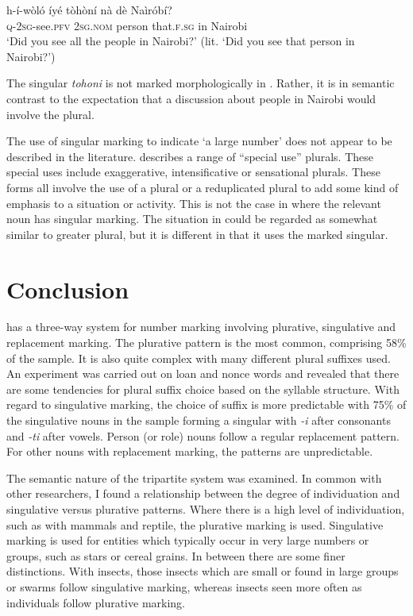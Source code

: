 \documentclass[output=paper]{langsci/langscibook}
\begin{document}
\ea\label{ex:moodie:14}
\gll h-í-wòló íyé tòhòní nà dè Naìróbí? \\
\textsc{q-2sg}-see.\textsc{pfv} 2\textsc{sg.nom} person that.\textsc{f.sg} in Nairobi \\
\glt ‘Did you see all the people in Nairobi?’ (lit. ‘Did you see that person in Nairobi?’)
\z

The singular \textit{tohoni} is not marked morphologically in . Rather, it is in semantic contrast to the expectation that a discussion about people in Nairobi would involve the plural.

The use of singular marking to indicate ‘a large number’ does not appear to be described in the literature. \citet[234]{Corbett2000} describes a range of “special use” plurals. These special uses include exaggerative, intensificative or sensational plurals. These forms all involve the use of a plural or a reduplicated plural to add some kind of emphasis to a situation or activity. This is not the case in  where the relevant noun has singular marking. The situation in  could be regarded as somewhat similar to greater plural, but it is different in that it uses the marked singular. 

\section{Conclusion}

 has a three-way system for number marking involving plurative, singulative and replacement marking. The plurative pattern is the most common, comprising 58\% of the sample. It is also quite complex with many different plural suffixes used. An experiment was carried out on loan and nonce words and revealed that there are some tendencies for plural suffix choice based on the syllable structure. With regard to singulative marking, the choice of suffix is more predictable with 75\% of the singulative nouns in the sample forming a singular with \textit{-i} after consonants and \textit{-ti} after vowels. Person (or role) nouns follow a regular replacement pattern. For other nouns with replacement marking, the patterns are unpredictable.

The semantic nature of the tripartite system was examined. In common with other researchers, I found a relationship between the degree of individuation and singulative versus plurative patterns. Where there is a high level of individuation, such as with mammals and reptile, the plurative marking is used. Singulative marking is used for entities which typically occur in very large numbers or groups, such as stars or cereal grains. In between there are some finer distinctions. With insects, those insects which are small or found in large groups or swarms follow singulative marking, whereas insects seen more often as individuals follow plurative marking.
\end{document}
